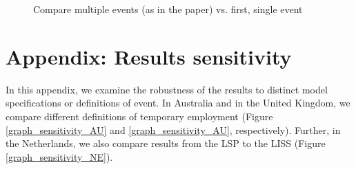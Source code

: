 \begin{figure}
    \caption{Compare multiple events (as in the paper) vs. first, single event}
    \label{graph_sensitivity_single_multiple_events}
\end{figure}{}


\clearpage
\section{Appendix: Results sensitivity}\label{sec:sensitivity_variable}
\setcounter{table}{0}
\setcounter{figure}{0}
\renewcommand*\thetable{\Alph{section}.\arabic{table}}
\renewcommand*\thefigure{\Alph{section}.\arabic{figure}}
\renewcommand{\theHfigure}{\Alph{section}.\arabic{table}}
\renewcommand{\theHtable}{\Alph{section}.\arabic{figure}}

In this appendix, we examine the robustness of the results to distinct model specifications or definitions of event.  In Australia and in the United Kingdom, we compare different definitions of temporary employment (Figure \ref{graph_sensitivity_AU} and \ref{graph_sensitivity_AU}, respectively).  Further, in the Netherlands, we also compare results from the LSP to the LISS (Figure \ref{graph_sensitivity_NE}).  



